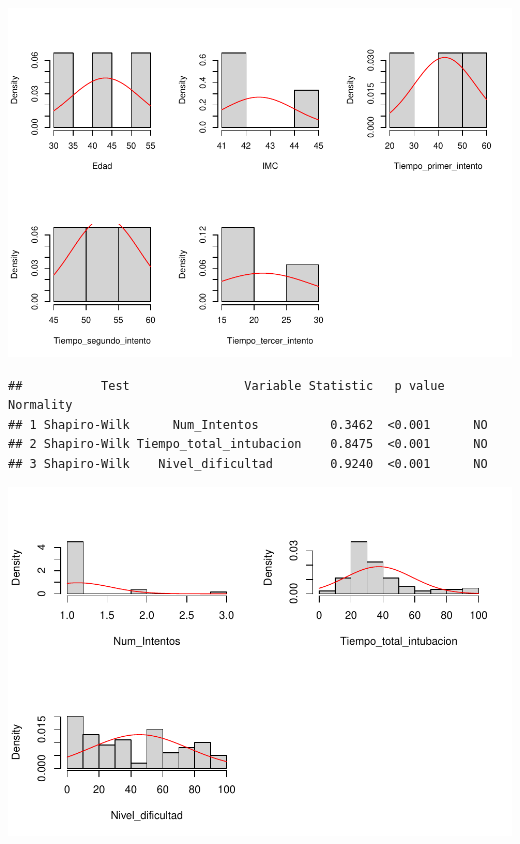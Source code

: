 \documentclass[
]{article}
\newenvironment{Shaded}{\begin{snugshade}}{\end{snugshade}}
\newcommand{\NormalTok}[1]{#1}
\newcommand{\SpecialCharTok}[1]{\textcolor[rgb]{0.81,0.36,0.00}{\textbf{#1}}}
\begin{document}
\includegraphics{Laringoscopia_files/figure-latex/unnamed-chunk-10-1.pdf}

\begin{Shaded}
\end{Shaded}

\begin{verbatim}
##           Test                Variable Statistic   p value Normality
## 1 Shapiro-Wilk      Num_Intentos          0.3462  <0.001      NO    
## 2 Shapiro-Wilk Tiempo_total_intubacion    0.8475  <0.001      NO    
## 3 Shapiro-Wilk    Nivel_dificultad        0.9240  <0.001      NO
\end{verbatim}

\includegraphics{Laringoscopia_files/figure-latex/unnamed-chunk-10-2.pdf}
\end{document}
